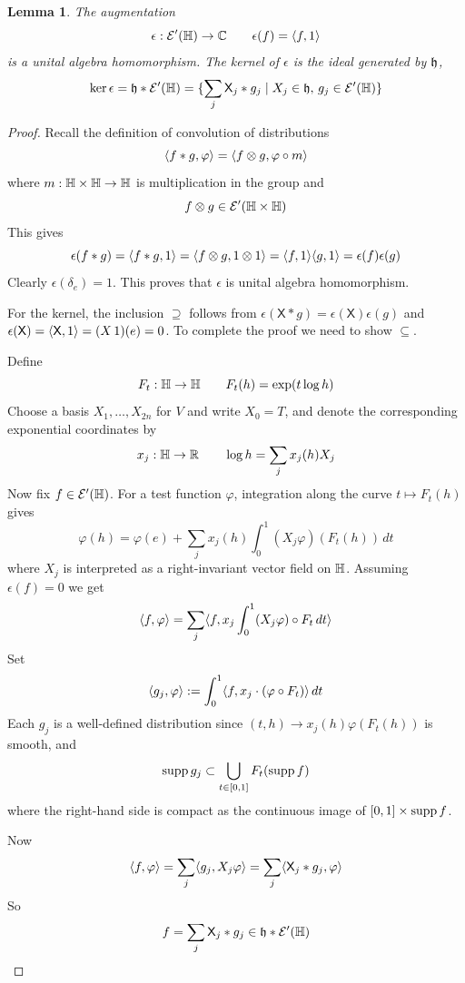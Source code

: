\documentclass[11pt]{amsart}
\theoremstyle{plain}
\newtheorem{lemma}[theorem]{Lemma}
\theoremstyle{definition}
\theoremstyle{remark}
\begin{document}
\begin{lemma}\label{lem:augmentation}
The augmentation
\[ \epsilon:{\mathcal{E}}'(\mathbb{H})\to {\mathbb{C}}\qquad \epsilon(f)=\langle f,1 \rangle  \]
is a unital algebra homomorphism.
The kernel of $\epsilon$ is the ideal generated by $\mathfrak{h}$,
\[ \ker \epsilon = \mathfrak{h} * {\mathcal{E}}'(\mathbb{H}) = \{\sum_j \mathsf X_j*g_j\mid X_j\in \mathfrak{h},\,g_j\in {\mathcal{E}}'(\mathbb{H})\}\]
\end{lemma}
\begin{proof}
Recall the definition of convolution of distributions
\[\langle f\ast g,\varphi \rangle=\langle f\otimes g, \varphi\circ m \rangle\]
where $m:\mathbb{H}\times\mathbb{H}\to \mathbb{H}$ is multiplication in the group and
\[f\otimes g\in  {\mathcal{E}}'(\mathbb{H}\times\mathbb{H})\]
This gives
\[ \epsilon(f*g)=\langle f * g,1 \rangle=\langle f\otimes g, 1\otimes 1 \rangle=\langle f,1 \rangle\langle g,1 \rangle=\epsilon(f)\epsilon(g)\]
Clearly $\epsilon(\delta_e)=1$. This proves that $\epsilon$ is unital algebra homomorphism.

For the kernel, the inclusion $\supseteq$ follows from $\epsilon(\mathsf X\ast g)=\epsilon(\mathsf X)\epsilon(g)$
and $\epsilon(\mathsf X)=\langle \mathsf X,1 \rangle=(X\,1)(e)=0$.
To complete the proof we need to show $\subseteq$.

Define
\[ F_t:\mathbb{H}\to \mathbb{H}\qquad F_t(h)=\exp(t\log h)\]
Choose a basis $X_1,\dots, X_{2n}$ for $V$ and write $X_0=T$, and denote the corresponding exponential coordinates by
\[ x_j:\mathbb{H}\to {\mathbb{R}}\qquad \log h=\sum_j x_j(h)X_j\]
Now fix $f\in {\mathcal{E}}'(\mathbb{H})$.
For a test function $\varphi$, integration along the curve $t\mapsto F_t(h)$ gives
\[ \varphi(h) = \varphi(e)+\sum_j x_j(h) \int_0^1 (X_j\varphi)(F_t(h))\,dt\]
where $X_j$ is interpreted as a right-invariant vector field on $\mathbb{H}$.
Assuming $\epsilon(f)=0$ we get
\[
\langle f,\varphi \rangle
=\sum_j \langle f, x_j \int_0^1 (X_j \varphi)\circ F_t \,dt \rangle
\]
Set
\[ \langle g_j,\varphi \rangle:=\int_0^1 \langle f, x_j\cdot (\varphi\circ F_t) \rangle\,dt\]
Each $g_j$ is a well-defined distribution since $(t,h)\to x_j(h)\varphi(F_t(h))$ is smooth,
and
\[ \operatorname{supp} g_j\subset \bigcup_{t\in [0,1]} F_t(\operatorname{supp} f)\]
where the right-hand side is compact as the continuous image of $[0,1]\times \operatorname{supp} f$.

Now
\[
\langle f,\varphi \rangle
= \sum_j \langle g_j, X_j \varphi \rangle
= \sum_j \langle \mathsf X_j*g_j, \varphi \rangle
\]
So
\[f=\sum_j \mathsf X_j*g_j\in \mathfrak{h} * {\mathcal{E}}'(\mathbb{H})\]
\end{proof}
\end{document}
